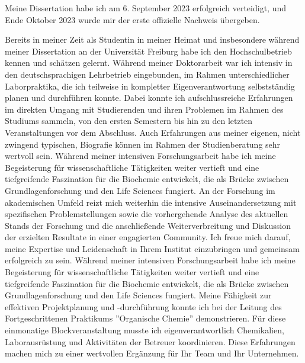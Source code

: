Meine Dissertation habe ich am 6. September 2023 erfolgreich verteidigt, und Ende Oktober 2023 wurde mir der erste offizielle Nachweis übergeben. \par
    {Bereits in meiner Zeit als Studentin in meiner Heimat und insbesondere während meiner Dissertation an der Universität Freiburg habe ich den Hochschulbetrieb kennen und schätzen gelernt. Während meiner Doktorarbeit war ich intensiv in den deutschsprachigen Lehrbetrieb eingebunden, im Rahmen unterschiedlicher Laborpraktika, die ich teilweise in kompletter Eigenverantwortung selbstständig planen und durchführen konnte. Dabei konnte ich aufschlussreiche Erfahrungen im direkten Umgang mit Studierenden und ihren Problemen im Rahmen des Studiums sammeln, von den ersten Semestern bis hin zu den letzten Veranstaltungen vor dem Abschluss. Auch Erfahrungen aus meiner eigenen, nicht zwingend typischen, Biografie können im Rahmen der Studienberatung sehr wertvoll sein.}{}
    {Während meiner intensiven Forschungsarbeit habe ich meine Begeisterung für wissenschaftliche Tätigkeiten weiter vertieft und eine tiefgreifende Faszination für die Biochemie entwickelt, die als Brücke zwischen Grundlagenforschung und den Life Sciences fungiert. An der Forschung im akademischen Umfeld reizt mich weiterhin die intensive Auseinandersetzung mit spezifischen Problemstellungen sowie die vorhergehende Analyse des aktuellen Stands der Forschung und die anschließende Weiterverbreitung und Diskussion der erzielten Resultate in einer engagierten Community. Ich freue mich darauf, meine Expertise und Leidenschaft in Ihrem Institut einzubringen und gemeinsam erfolgreich zu sein.}{}
    {Während meiner intensiven Forschungsarbeit habe ich meine Begeisterung für wissenschaftliche Tätigkeiten weiter vertieft und eine tiefgreifende Faszination für die Biochemie entwickelt, die als Brücke zwischen Grundlagenforschung und den Life Sciences fungiert. Meine Fähigkeit zur effektiven Projektplanung und -durchführung konnte ich bei der Leitung des Fortgeschrittenen Praktikums ''Organische Chemie'' demonstrieren. Für diese einmonatige Blockveranstaltung musste ich eigenverantwortlich Chemikalien, Laborausrüstung und Aktivitäten der Betreuer koordinieren. Diese Erfahrungen machen mich zu einer wertvollen Ergänzung für Ihr Team und Ihr Unternehmen.}{}
